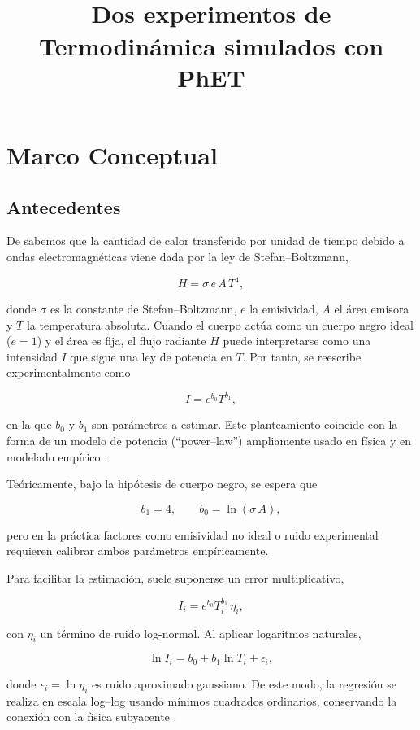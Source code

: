 \documentclass[12pt,a4paper]{config/myConfig}
\title{\Large $\ $\\ \bf Dos experimentos de Termodinámica simulados con PhET}
\author
\newcommand{\AssigmentNumber}{Practica 8}
\newcommand{\AssigmentDate}{21 de Abril del 2025}
\begin{document}
\thispagestyle{myheadings}
\pagestyle{myheadings}
\markright{\tt \AssigmentNumber|    \AssigmentDate}%



\section{Marco Conceptual}
\label{sec:MARCO-CONCEPTUAL}

\subsection{Antecedentes}
\label{sec:ANTECEDENTES}

De \citet{physicsTextbook} sabemos que la cantidad de calor transferido por unidad de tiempo debido a ondas electromagnéticas viene dada por la ley de Stefan–Boltzmann,

\[
H = \sigma\,e\,A\,T^4,
\]

donde \(\sigma\) es la constante de Stefan–Boltzmann, \(e\) la emisividad, \(A\) el área emisora y \(T\) la temperatura absoluta. Cuando el cuerpo actúa como un cuerpo negro ideal (\(e=1\)) y el área es fija, el flujo radiante \(H\) puede interpretarse como una intensidad \(I\) que sigue una ley de potencia en \(T\). Por tanto, se reescribe experimentalmente como

\[
I = e^{b_0}T^{b_1},
\]

en la que \(b_0\) y \(b_1\) son parámetros a estimar. Este planteamiento coincide con la forma de un modelo de potencia (“power–law”) ampliamente usado en física y en modelado empírico \citep{christensen2020analysis, nelson2006applied}.

Teóricamente, bajo la hipótesis de cuerpo negro, se espera que

\[
b_1 = 4,
\qquad
b_0 = \ln(\sigma\,A),
\]

pero en la práctica factores como emisividad no ideal o ruido experimental requieren calibrar ambos parámetros empíricamente.

Para facilitar la estimación, suele suponerse un error multiplicativo,

\[
I_i = e^{b_0}T_i^{b_1}\,\eta_i,
\]

con \(\eta_i\) un término de ruido log-normal. Al aplicar logaritmos naturales,

\[
\ln I_i = b_0 + b_1\ln T_i + \epsilon_i,
\]

donde \(\epsilon_i = \ln\eta_i\) es ruido aproximado gaussiano. De este modo, la regresión se realiza en escala log–log usando mínimos cuadrados ordinarios, conservando la conexión con la física subyacente \citep{box1976transformation}.
\end{document}
